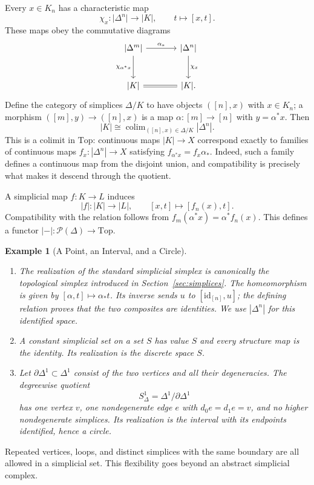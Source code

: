 \documentclass[11pt]{article}
\theoremstyle{linked}
\theoremstyle{plainlecture}
\newtheorem{example}[proposition]{Example}
\newcommand{\PSh}{\mathcal{P}}
\newcommand{\id}{\mathrm{id}}
\newcommand{\Top}{\mathrm{Top}}
\begin{document}
Every $x\in K_n$ has a characteristic map
\[
\chi_x:\lvert\Delta^{n}\rvert\longrightarrow|K|,\qquad t\longmapsto[x,t].
\]
These maps obey the commutative diagrams
\[
\begin{tikzcd}[column sep=large,row sep=large]
\lvert\Delta^{m}\rvert \arrow[r,"\alpha_*"] \arrow[d,"\chi_{\alpha^*x}"'] &
\lvert\Delta^{n}\rvert \arrow[d,"\chi_x"]\\
\lvert K\rvert \arrow[r,equal] & \lvert K\rvert.
\end{tikzcd}
\]
Define the category of simplices $\Delta/K$ to have objects $([n],x)$ with $x\in K_n$; a morphism $([m],y)\to([n],x)$ is a map $\alpha:[m]\to[n]$ with $y=\alpha^*x$. Then
\[
|K|\cong\mathop{\operatorname{colim}}_{([n],x)\in\Delta/K}|\Delta^n|.
\]
This is a colimit in $\Top$: continuous maps $|K|\to X$ correspond exactly to families of continuous maps $f_x:|\Delta^n|\to X$ satisfying $f_{\alpha^*x}=f_x\alpha_*$. Indeed, such a family defines a continuous map from the disjoint union, and compatibility is precisely what makes it descend through the quotient.

A simplicial map $f:K\to L$ induces
\[
|f|:|K|\to|L|,\qquad [x,t]\longmapsto[f_n(x),t].
\]
Compatibility with the relation follows from $f_m(\alpha^*x)=\alpha^*f_n(x)$. This defines a functor $|{-}|:\PSh(\Delta)\to\Top$.

\begin{example}[A Point, an Interval, and a Circle]
\begin{enumerate}
\item The realization of the standard simplicial simplex is canonically the topological simplex introduced in Section~\ref{sec:simplices}. The homeomorphism is given by $[\alpha,t]\mapsto\alpha_*t$. Its inverse sends $u$ to $[\id_{[n]},u]$; the defining relation proves that the two composites are identities. We use $|\Delta^{n}|$ for this identified space.
\item A constant simplicial set on a set $S$ has value $S$ and every structure map is the identity. Its realization is the discrete space $S$.
\item Let $\partial\Delta^{1}\subset\Delta^{1}$ consist of the two vertices and all their degeneracies. The degreewise quotient
\[
S^1_\Delta=\Delta^{1}/\partial\Delta^{1}
\]
has one vertex $v$, one nondegenerate edge $e$ with $d_0e=d_1e=v$, and no higher nondegenerate simplices. Its realization is the interval with its endpoints identified, hence a circle.
\end{enumerate}
\end{example}
Repeated vertices, loops, and distinct simplices with the same boundary are all allowed in a simplicial set. This flexibility goes beyond an abstract simplicial complex.
\end{document}

